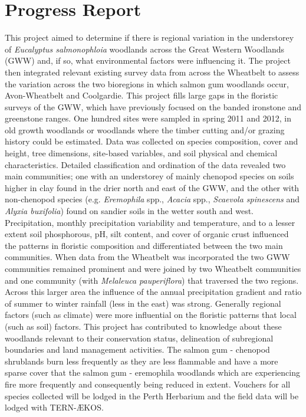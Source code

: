 \documentclass[version=last, paper=a4, DIV=18, usenames, dvipsnames]{scrartcl}
\begin{document}
%

%




\section*{Progress Report}
This project aimed to determine if there is regional variation in the
understorey of \emph{Eucalyptus salmonophloia} woodlands across the
Great Western Woodlands (GWW) and, if so, what environmental factors
were influencing it. The project then integrated relevant existing
survey data from across the Wheatbelt to assess the variation across the
two bioregions in which salmon gum woodlands occur, Avon-Wheatbelt and
Coolgardie. This project fills large gaps in the floristic surveys of
the GWW, which have previously focused on the banded ironstone and
greenstone ranges. One hundred sites were sampled in spring 2011 and
2012, in old growth woodlands or woodlands where the timber cutting
and/or grazing history could be estimated. Data was collected on species
composition, cover and height, tree dimensions, site-based variables,
and soil physical and chemical characteristics. Detailed classification
and ordination of the data revealed two main communities; one with an
understorey of mainly chenopod species on soils higher in clay found in
the drier north and east of the GWW, and the other with non-chenopod
species (e.g. \emph{Eremophila} spp., \emph{Acacia} spp., \emph{Scaevola
spinescens} and \emph{Alyxia buxifolia}) found on sandier soils in the
wetter south and west. Precipitation, monthly precipitation variability
and temperature, and to a lesser extent soil phosphorous, pH, silt
content, and cover of organic crust influenced the patterns in floristic
composition and differentiated between the two main communities. When
data from the Wheatbelt was incorporated the two GWW communities
remained prominent and were joined by two Wheatbelt communities and one
community (with \emph{Melaleuca pauperiflora}) that traversed the two
regions. Across this larger area the influence of the annual
precipitation gradient and ratio of summer to winter rainfall (less in
the east) was strong. Generally regional factors (such as climate) were
more influential on the floristic patterns that local (such as soil)
factors. This project has contributed to knowledge about these woodlands
relevant to their conservation status, delineation of subregional
boundaries and land management activities. The salmon gum - chenopod
shrublands burn less frequently as they are less flammable and have a
more sparse cover that the salmon gum - eremophila woodlands which are
experiencing fire more frequently and consequently being reduced in
extent. Vouchers for all species collected will be lodged in the Perth
Herbarium and the field data will be lodged with TERN-ÆKOS.




\clearpage
\end{document}
